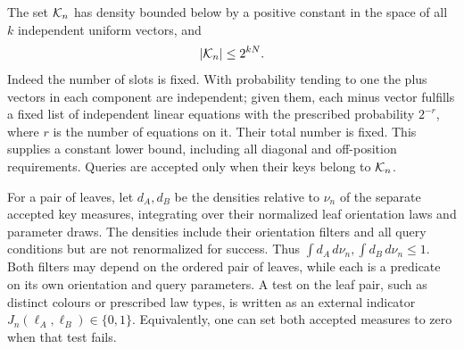 The set $\mathcal K_n$ has density bounded below by a positive constant
in the space of all $k$ independent uniform vectors, and
\begin{equation}\label{eq:key-space-size}
 |\mathcal K_n|\le 2^{kN}.
\end{equation}
Indeed the number of slots is fixed.  With probability tending
to one the plus vectors in each component are independent;
given them, each minus vector fulfills a fixed list of
independent linear equations with the prescribed probability
$2^{-r}$, where $r$ is the number of equations on it.  Their
total number is fixed.  This supplies a constant lower bound,
including all diagonal and off-position requirements.
Queries are accepted only when their keys belong to $\mathcal K_n$.

For a pair of leaves, let $d_A,d_B$ be the densities relative
to $\nu_n$ of the separate accepted key measures, integrating
over their normalized leaf orientation laws and parameter draws.
The densities include their orientation filters and all query
conditions but are not renormalized for success.  Thus
$\int d_A\,d\nu_n,\int d_B\,d\nu_n\le1$.
Both filters may depend on the ordered pair of leaves, while
each is a predicate on its own orientation and query parameters.
A test on the leaf pair, such as distinct colours or prescribed
law types, is written as an external indicator
$J_n(\ell_A,\ell_B)\in\{0,1\}$.  Equivalently, one can set
both accepted measures to zero when that test fails.

